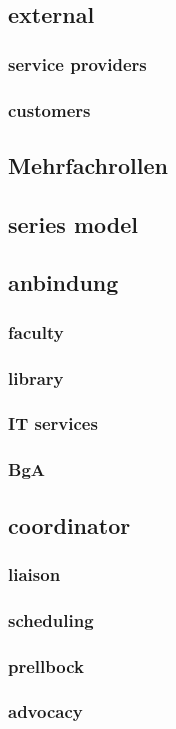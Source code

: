 \documentclass[output=guidelines,guidelines] {langscibook}
\begin{document}
\subsection{external}
\subsubsection{service providers}
\subsubsection{customers}
\subsection{Mehrfachrollen}
\subsection{series model}
\subsection{anbindung}
\subsubsection{faculty}
\subsubsection{library}
\subsubsection{IT services}
\subsubsection{BgA}
\subsection{coordinator}
\subsubsection{liaison}
\subsubsection{scheduling}
\subsubsection{prellbock}
\subsubsection{advocacy}
\end{document}
